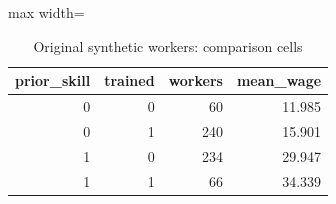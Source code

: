 \begin{table}[htbp]
\centering
\caption{Original synthetic workers: comparison cells}
\begingroup
\small
\setlength{\tabcolsep}{6pt}
\renewcommand{\arraystretch}{1.12}
\begin{adjustbox}{max width=\linewidth}
\begin{tabular}{@{}rrrr@{}}
\toprule
prior\_skill & trained & workers & mean\_wage \\
\midrule
0 & 0 & 60 & 11.985 \\
0 & 1 & 240 & 15.901 \\
1 & 0 & 234 & 29.947 \\
1 & 1 & 66 & 34.339 \\
\bottomrule
\end{tabular}
\end{adjustbox}
\endgroup
\end{table}